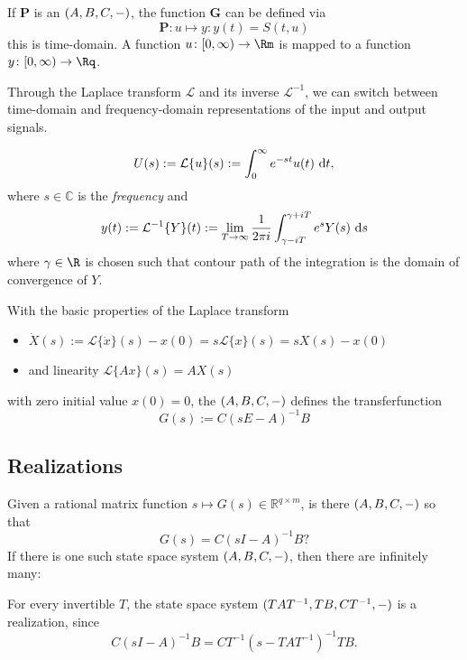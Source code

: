 If $\mathbf P$ is an $(A,B,C,-)$, the function $\mathbf G$ can be defined via 
\begin{equation*}
	\mathbf P \colon u \mapsto y\colon y(t) = S(t, u)
\end{equation*}
this is time-domain. A function $u \colon [0, \infty) \to \Rm$ is mapped to a function $y\colon [0, \infty)  \to \Rq$.

Through the Laplace transform $\mathcal L$ and its inverse $\mathcal L^{-1}$, we can switch between time-domain and frequency-domain representations of the input and output signals.

\begin{equation*}
	U(s) := \mathcal L\{u\}(s) := \int_0^\infty e^{-st}u(t)\text{~\textup{d}} t,
\end{equation*}
where $s\in \mathbb C$ is the \emph{frequency} and
\begin{equation*}
	y(t) := \mathcal L^{-1}\{Y\}(t) := \lim_{T\to \infty} \frac 1{2\pi i} \int_{\gamma - iT}^{\gamma + iT} e^{s}Y(s)\text{~\textup{d}} s
\end{equation*}
where $\gamma \in \R$ is chosen such that contour path of the integration is the domain of convergence of $Y$.

With the basic properties of the Laplace transform
\begin{itemize}
	\item $\dot X(s):= \mathcal L\{\dot x\}(s) -x(0)= s\mathcal L\{x\}(s) = s X(s)-x(0)$
	\item and linearity $\mathcal L\{Ax\}(s) = AX(s)$
\end{itemize}
with zero initial value $x(0) = 0$, the $(A,B,C,-)$ defines the transferfunction
\begin{equation*}
	G(s) := C(sE-A)^{-1}B
\end{equation*}

\subsection{Realizations}
Given a rational matrix function $s\mapsto G(s)\in \mathbb R^{q\times m}$, is there $(A,B,C,-)$ so that 
\begin{equation*}
	G(s) = C(sI-A)^{-1}B ?
\end{equation*}
If there is one such state space system $(A,B,C,-)$, then there are infinitely many:

For every invertible $T$, the state space system $(TAT^{-1},TB,CT^{-1},-)$ is a realization, since
\begin{equation*}
	C(sI-A)^{-1}B = CT^{-1}(s-TAT^{-1})^{-1}TB.
\end{equation*}

